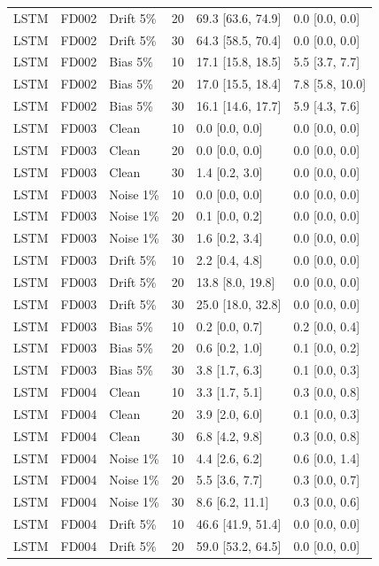 \documentclass[10pt,a4paper]{article}
\begin{document}
\begin{center}
\begin{longtable}{lllcll}
LSTM & FD002 & Drift 5\% & 20 & 69.3 [63.6, 74.9] & 0.0 [0.0, 0.0]  \\
LSTM & FD002 & Drift 5\% & 30 & 64.3 [58.5, 70.4] & 0.0 [0.0, 0.0]  \\
LSTM & FD002 & Bias 5\% & 10 & 17.1 [15.8, 18.5] & 5.5 [3.7, 7.7]  \\
LSTM & FD002 & Bias 5\% & 20 & 17.0 [15.5, 18.4] & 7.8 [5.8, 10.0]  \\
LSTM & FD002 & Bias 5\% & 30 & 16.1 [14.6, 17.7] & 5.9 [4.3, 7.6]  \\
LSTM & FD003 & Clean & 10 & 0.0 [0.0, 0.0] & 0.0 [0.0, 0.0]  \\
LSTM & FD003 & Clean & 20 & 0.0 [0.0, 0.0] & 0.0 [0.0, 0.0]  \\
LSTM & FD003 & Clean & 30 & 1.4 [0.2, 3.0] & 0.0 [0.0, 0.0]  \\
LSTM & FD003 & Noise 1\% & 10 & 0.0 [0.0, 0.0] & 0.0 [0.0, 0.0]  \\
LSTM & FD003 & Noise 1\% & 20 & 0.1 [0.0, 0.2] & 0.0 [0.0, 0.0]  \\
LSTM & FD003 & Noise 1\% & 30 & 1.6 [0.2, 3.4] & 0.0 [0.0, 0.0]  \\
LSTM & FD003 & Drift 5\% & 10 & 2.2 [0.4, 4.8] & 0.0 [0.0, 0.0]  \\
LSTM & FD003 & Drift 5\% & 20 & 13.8 [8.0, 19.8] & 0.0 [0.0, 0.0]  \\
LSTM & FD003 & Drift 5\% & 30 & 25.0 [18.0, 32.8] & 0.0 [0.0, 0.0]  \\
LSTM & FD003 & Bias 5\% & 10 & 0.2 [0.0, 0.7] & 0.2 [0.0, 0.4]  \\
LSTM & FD003 & Bias 5\% & 20 & 0.6 [0.2, 1.0] & 0.1 [0.0, 0.2]  \\
LSTM & FD003 & Bias 5\% & 30 & 3.8 [1.7, 6.3] & 0.1 [0.0, 0.3]  \\
LSTM & FD004 & Clean & 10 & 3.3 [1.7, 5.1] & 0.3 [0.0, 0.8]  \\
LSTM & FD004 & Clean & 20 & 3.9 [2.0, 6.0] & 0.1 [0.0, 0.3]  \\
LSTM & FD004 & Clean & 30 & 6.8 [4.2, 9.8] & 0.3 [0.0, 0.8]  \\
LSTM & FD004 & Noise 1\% & 10 & 4.4 [2.6, 6.2] & 0.6 [0.0, 1.4]  \\
LSTM & FD004 & Noise 1\% & 20 & 5.5 [3.6, 7.7] & 0.3 [0.0, 0.7]  \\
LSTM & FD004 & Noise 1\% & 30 & 8.6 [6.2, 11.1] & 0.3 [0.0, 0.6]  \\
LSTM & FD004 & Drift 5\% & 10 & 46.6 [41.9, 51.4] & 0.0 [0.0, 0.0]  \\
LSTM & FD004 & Drift 5\% & 20 & 59.0 [53.2, 64.5] & 0.0 [0.0, 0.0]  \\

\end{longtable}
\end{center}
\end{document}
